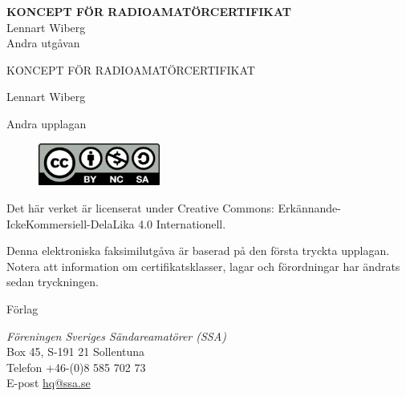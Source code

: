 \documentclass[a4paper,twoside,twocolumn,openright]{book}
\begin{document}
\pagestyle{empty}



\onecolumn
\vspace{3cm}
\begin{center}
\Huge{\bfseries{KONCEPT FÖR RADIOAMATÖRCERTIFIKAT}} \\[2ex]
\huge{Lennart Wiberg} \\
\Large{Andra utgåvan}
\end{center}

\clearpage



\setlength{\parindent}{0px}
\setlength{\parskip}{1ex}

\vspace{10em}

\begin{center}
KONCEPT FÖR RADIOAMATÖRCERTIFIKAT

Lennart Wiberg
\end{center}


Andra upplagan

\begin{figure}
    \centering
    \includegraphics[width=4cm]{images/cc-by-nc-sa}
\end{figure}

Det här verket är licenserat under Creative Commons:
Erkännande-IckeKommersiell-DelaLika 4.0 Internationell.

Denna elektroniska faksimilutgåva är baserad på den första tryckta
upplagan. Notera att information om certifikatsklasser, lagar och förordningar
har ändrats sedan tryckningen.


\vfill

Förlag

\textit{Föreningen Sveriges Sändareamatörer (SSA)}\\
Box 45, S-191 21 Sollentuna\\
Telefon +46-(0)8 585 702 73\\
E-post \href{mailto:hq@ssa.se}{hq@ssa.se}
\end{document}
